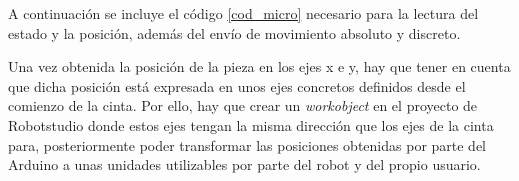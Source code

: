 A continuación se incluye el código \ref{cod_micro} necesario para la lectura del estado y la posición, además del envío
de movimiento absoluto y discreto.



Una vez obtenida la posición de la pieza en los ejes x e y, hay que tener en cuenta que dicha posición está expresada en unos ejes concretos definidos desde el comienzo de la cinta. Por ello, hay que crear 
un \emph{workobject} en el proyecto de Robotstudio donde estos ejes tengan la misma dirección que los ejes de la cinta para, posteriormente poder transformar las posiciones obtenidas por parte del Arduino a unas unidades utilizables por parte del robot y del propio usuario.